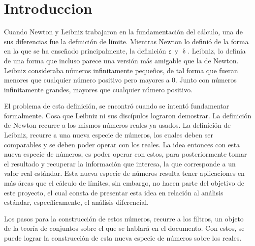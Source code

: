 \section{Introduccion}

Cuando Newton y Leibniz trabajaron en la fundamentación del cálculo, una
de sus diferencias fue la definición de límite. Mientras Newton lo
definió de la forma en la que se ha enseñado principalmente, la
definición $\upvarepsilon$ y $\updelta$. Leibniz, lo definia de una forma que
incluso parece una versión más amigable que la de Newton. Leibniz
consideraba números infinitamente pequeños, de tal forma que fueran
menores que cualquier número positivo pero mayores a $0$. Junto con
números infinitamente grandes, mayores que cualquier número positivo.

El problema de esta definición, se encontró cuando se intentó fundamentar
formalmente. Cosa que Leibniz ni sus discípulos lograron demostrar.
La definición de Newton recurre a los mismos números reales ya usados.
La definición de Leibniz, recurre a una nueva especie de números, los cuales
deben ser comparables y se deben poder operar con los reales. La idea entonces
con esta nueva especie de números, es poder operar con estos, para
posteriormente tomar el resultado y recuperar la información que interesa,
la que corresponde a un valor real estándar. Esta nueva especie de números
resulta tener aplicaciones en más áreas que el cálculo de límites, sin
embargo, no hacen parte del objetivo de este proyecto, el cual consta de
presentar esta idea en relación al análisis estándar, específicamente,
el análisis diferencial.

Los pasos para la construcción de estos números, recurre a los filtros,
un objeto de la teoría de conjuntos sobre el que se hablará en el
documento. Con estos, se puede lograr la construcción de esta nueva especie
de números sobre los reales. 
